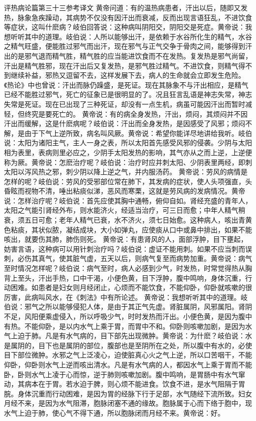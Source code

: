 \documentclass[12pt,UTF8]{ctexbook}
\begin{document}
评热病论篇第三十三参考译文
黄帝问道：有的温热病患者，汗出以后，随即又发热，脉象急疾躁动，其病势不仅没有因汗出而衰减，反而出现言语狂乱，不进饮食等症状，这叫什麽病？岐伯回答说：这种病叫阴阳交，阴阳交是死症。黄帝说：我想听听其中的道理。岐伯说：人所以能够出汗，是依赖于水谷所化生的精气，水谷之精气旺盛，便能胜过邪气而出汗，现在邪气与正气交争于骨肉之间，能够得到汗出的是邪气退而精气胜，精气胜的应当能进饮食而不在发热。复发热是邪气尚留，汗出是精气胜邪，现在汗出后又复发热，是邪气胜过精气。不进饮食，则精气得不到继续补益，邪热又逗留不去，这样发展下去，病人的生命就会立即发生危险。《热论》中也曾说：汗出而脉仍躁盛，是死证。现在其脉象不与汗出相应，是精气已经不能胜过邪气，死亡的征象已是很明显的了。况且狂言乱语是神志失常，神志失常是死证。现在已出现了三种死证，却没有一点生机，病虽可能因汗出而暂时减轻，但终究是要死亡的。
黄帝说：有的病全身发热，汗出，烦闷，其烦闷并不因汗出而缓解，这是什麽病呢？岐伯说：汗出而全身发热，是因感受了风邪；烦闷不解，是由于下气上逆所致，病名叫风厥。黄帝说：希望你能详尽地讲给我听。岐伯说：太阳为诸阳主气，主人一身之表，所以太阳首先感受风邪的侵袭。少阴与太阳相为表里，表病则里必应之，少阴手太阳发热的影响，其气亦从之而上逆，上逆便称为厥。黄帝说：怎麽治疗呢？岐伯说：治疗时应并刺太阳、少阴表里两经，即刺太阳以泻风热之邪，刺少阴以降上逆之气，并内服汤药。
黄帝说：劳风的病情是怎样的呢？岐伯说：劳风的受邪部位常在肺下，其发病的症状，使人头项强直，头昏眩而视物不清，唾出粘痰似涕，恶风而寒栗，这就是劳风病的发病情况。黄帝说：怎样治疗呢？岐伯说：首先应使其胸中通畅，俯仰自如。肾经充盛的青年人，太阳之气能引肾经外布，则水能济火，经适当治疗，可三日而愈；中年人精气稍衰，须五日可愈；老年人精气已衰，水不济火，须七日始愈。这种病人，咳出青黄色粘痰，其状似脓，凝结成块，大小如弹丸，应使痰从口中或鼻中排出，如果不能咳出，就要伤其肺，肺伤则死。
黄帝说：有患肾风的人，面部浮肿，目下壅起，妨害言语，这种病可以用针刺治疗吗？岐伯说：虚证不能用刺。如果不应当刺而误刺，必伤其真气，使其脏气虚，五天以后，则病气复至而病势加重。黄帝说：病气至时情况怎样呢？岐伯说：病气至时，病人必感到少气，时发热，时常觉得热从胸背上至头，汗出手热，口中干渴，小便色黄，目下浮肿，腹中鸣响，身体沉重，行动困难。如患者是妇女则月经闭止，心烦而不能饮食，不能仰卧，仰卧就咳嗽的很厉害，此病叫风水，在《刺法》中有所论述。
黄帝说：我想听听其中的道理。岐伯说：邪气之所以能够侵犯人体，是由于其正气先虚。肾脏属阴，风邪属阳。肾阴不足，风阳便乘虚侵入，所以呼吸少气，时时发热而汗出。小便色黄，是因为腹中有热。不能仰卧，是以内水气上乘于胃，而胃中不和。仰卧则咳嗽加剧，是因为水气上迫于肺。凡是有水气病的，目下部先出现微肿。黄帝说：为什麽？岐伯说：水是属阴的，目下也是属阴的部位，腹部也是至阴所在之处，所以腹中有水的，必使目下部位微肿。水邪之气上泛凌心，迫使脏真心火之气上逆，所以口苦咽干，不能仰卧，仰卧则水气上逆而咳出清水。凡是有水气病的人，都因水气上乘于胃而不能卧，卧则水气上凌于心而惊，逆于肺则咳嗽加剧。腹中鸣响，是胃肠中有水气窜动，其病本在于胃。若水迫于脾，则心烦不能进食。饮食不进，是水气阻隔于胃脘。身体沉重而行动困难，是因为胃的经脉下行于足部，水气随经下流所致。妇女月经不来，是因为水气阻滞，胞脉闭塞不通的缘故。胞脉属于心而下络于胞中，现水气上迫于肺，使心气不得下通，所以胞脉闭而月经不来。黄帝说：好。
\end{document}
